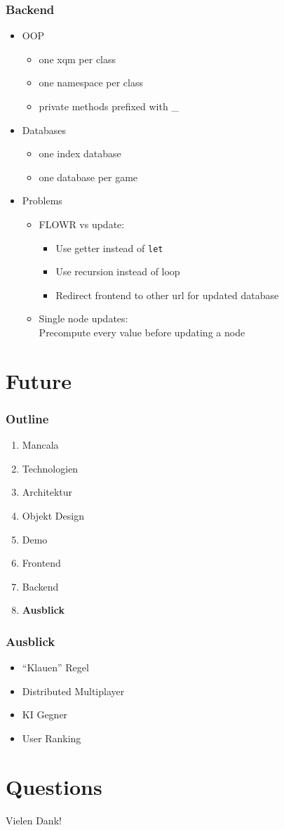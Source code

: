 \documentclass[
	10pt,
	t		%
]{beamer}
\begin{document}
\begin{frame}
\frametitle{Backend}
\begin{itemize}
\item OOP
\begin{itemize}
\item one xqm per class
\item one namespace per class
\item private methods prefixed with \_
\end{itemize}
\item Databases
\begin{itemize}
\item one index database
\item one database per game
\end{itemize}
\item Problems
\begin{itemize}
\item FLOWR vs update: 
\begin{itemize}
\item Use getter instead of \texttt{let}
\item Use recursion instead of loop
\item Redirect frontend to other url for updated database
\end{itemize}
\item Single node updates:\\
\quad Precompute every value before updating a node
\end{itemize}
\end{itemize}

\end{frame}

\section{Future}
\begin{frame}
\frametitle{Outline}
\begin{enumerate}
\item Mancala
\item Technologien
\item Architektur
\item Objekt Design
\item Demo
\item Frontend
\item Backend
\item \textbf{Ausblick}
\end{enumerate}
\end{frame}

\begin{frame}
\frametitle{Ausblick}
\begin{itemize}
\item ``Klauen'' Regel
\item Distributed Multiplayer
\item KI Gegner
\item User Ranking
\end{itemize}
\end{frame}

\section{Questions}
\begin{frame}[plain, c]
\begin{center}
\Large Vielen Dank!
\end{center}
\end{frame}
\end{document}
